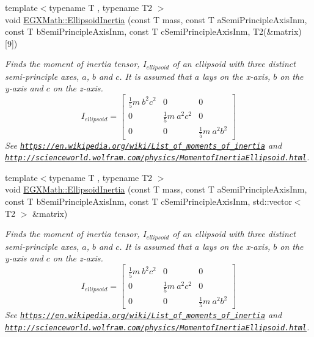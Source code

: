 \begin{DoxyCompactItemize}
\item 
{\footnotesize template$<$typename T , typename T2 $>$ }\\void \mbox{\hyperlink{group___e_g_x_math-_geometry-3_d-_ellipsoid-_inertia_ga3b6f641f06037be75b8f51822eaa71bf}{E\+G\+X\+Math\+::\+Ellipsoid\+Inertia}} (const T mass, const T a\+Semi\+Principle\+Axis\+Inm, const T b\+Semi\+Principle\+Axis\+Inm, const T c\+Semi\+Principle\+Axis\+Inm, T2(\&matrix)\mbox{[}9\mbox{]})
\begin{DoxyCompactList}\small\item\em Finds the moment of inertia tensor, $I_{ellipsoid}$ of an ellipsoid with three distinct semi-\/principle axes, $a$, $b$ and $c$. It is assumed that $a$ lays on the x-\/axis, $b$ on the y-\/axis and $c$ on the z-\/axis. \[ I_{ellipsoid}=\begin{bmatrix} \frac{1}{5}m\ b^2c^2 & 0 & 0\\ 0 & \frac{1}{5}m\ a^2c^2 & 0\\ 0 & 0 & \frac{1}{5}m\ a^2b^2 \end{bmatrix} \] See \href{https://en.wikipedia.org/wiki/List_of_moments_of_inertia}{\tt https\+://en.\+wikipedia.\+org/wiki/\+List\+\_\+of\+\_\+moments\+\_\+of\+\_\+inertia} and \href{http://scienceworld.wolfram.com/physics/MomentofInertiaEllipsoid.html}{\tt http\+://scienceworld.\+wolfram.\+com/physics/\+Momentof\+Inertia\+Ellipsoid.\+html}. \end{DoxyCompactList}\item 
{\footnotesize template$<$typename T , typename T2 $>$ }\\void \mbox{\hyperlink{group___e_g_x_math-_geometry-3_d-_ellipsoid-_inertia_ga05dee023c58e7615d16e431bf5a99609}{E\+G\+X\+Math\+::\+Ellipsoid\+Inertia}} (const T mass, const T a\+Semi\+Principle\+Axis\+Inm, const T b\+Semi\+Principle\+Axis\+Inm, const T c\+Semi\+Principle\+Axis\+Inm, std\+::vector$<$ T2 $>$ \&matrix)
\begin{DoxyCompactList}\small\item\em Finds the moment of inertia tensor, $I_{ellipsoid}$ of an ellipsoid with three distinct semi-\/principle axes, $a$, $b$ and $c$. It is assumed that $a$ lays on the x-\/axis, $b$ on the y-\/axis and $c$ on the z-\/axis. \[ I_{ellipsoid}=\begin{bmatrix} \frac{1}{5}m\ b^2c^2 & 0 & 0\\ 0 & \frac{1}{5}m\ a^2c^2 & 0\\ 0 & 0 & \frac{1}{5}m\ a^2b^2 \end{bmatrix} \] See \href{https://en.wikipedia.org/wiki/List_of_moments_of_inertia}{\tt https\+://en.\+wikipedia.\+org/wiki/\+List\+\_\+of\+\_\+moments\+\_\+of\+\_\+inertia} and \href{http://scienceworld.wolfram.com/physics/MomentofInertiaEllipsoid.html}{\tt http\+://scienceworld.\+wolfram.\+com/physics/\+Momentof\+Inertia\+Ellipsoid.\+html}. \end{DoxyCompactList}\item 

\end{DoxyCompactItemize}
